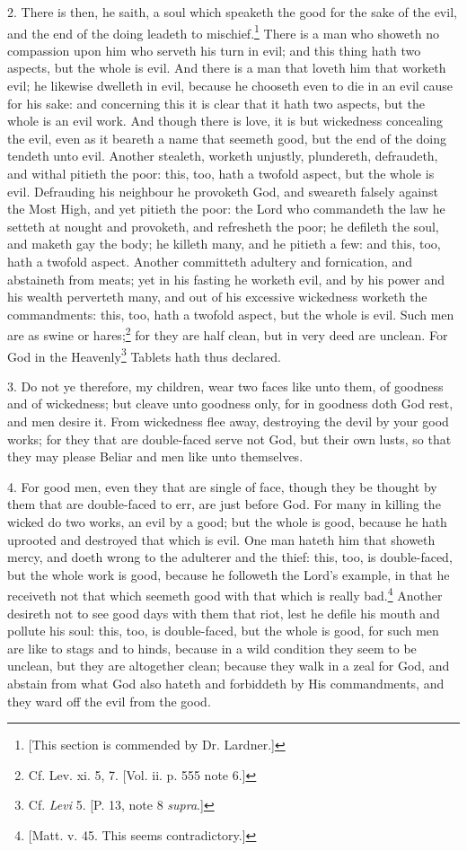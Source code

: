 2. There is then, he saith, a soul which speaketh the good for the sake of the evil, and the end of the doing leadeth to mischief.\footnote{[This section is commended by Dr. Lardner.]} There is a man who showeth no compassion upon him who serveth his turn in evil; and this thing hath two aspects, but the whole is evil. And there is a man that loveth him that worketh evil; he likewise dwelleth in evil, because he chooseth even to die in an evil cause for his sake: and concerning this it is clear that it hath two aspects, but the whole is an evil work. And though there is love, it is but wickedness concealing the evil, even as it beareth a name that seemeth good, but the end of the doing tendeth unto evil. Another stealeth, worketh unjustly, plundereth, defraudeth, and withal pitieth the poor: this, too, hath a twofold aspect, but the whole is evil. Defrauding his neighbour he provoketh God, and sweareth falsely against the Most High, and yet pitieth the poor: the Lord who commandeth the law he setteth at nought and provoketh, and refresheth the poor; he defileth the soul, and maketh gay the body; he killeth many, and he pitieth a few: and this, too, hath a twofold aspect. Another committeth adultery and fornication, and abstaineth from meats; yet in his fasting he worketh evil, and by his power and his wealth perverteth many, and out of his excessive wickedness worketh the commandments: this, too, hath a twofold aspect, but the whole is evil. Such men are as swine or hares;\footnote{Cf. Lev. xi. 5, 7. [Vol. ii. p. 555 note 6.]} for they are half clean, but in very deed are unclean. For God in the Heavenly\footnote{Cf. \emph{Levi} 5. [P. 13, note 8 \emph{supra}.]} Tablets hath thus declared.

3. Do not ye therefore, my children, wear two faces like unto them, of goodness and of wickedness; but cleave unto goodness only, for in goodness doth God rest, and men desire it. From wickedness flee away, destroying the devil by your good works; for they that are double-faced serve not God, but their own lusts, so that they may please Beliar and men like unto themselves.

4. For good men, even they that are single of face, though they be thought by them that are double-faced to err, are just before God. For many in killing the wicked do two works, an evil by a good; but the whole is good, because he hath uprooted and destroyed that which is evil. One man hateth him that showeth mercy, and doeth wrong to the adulterer and the thief: this, too, is double-faced, but the whole work is good, because he followeth the Lord’s example, in that he receiveth not that which seemeth good with that which is really bad.\footnote{[Matt. v. 45. This seems contradictory.]} Another desireth not to see good days with them that riot, lest he defile his mouth and pollute his soul: this, too, is double-faced, but the whole is good, for such men are like to stags and to hinds, because in a wild condition they seem to be unclean, but they are altogether clean; because they walk in a zeal for God, and abstain from what God also hateth and forbiddeth by His commandments, and they ward off the evil from the good.

